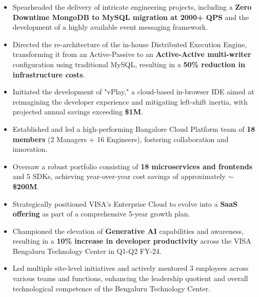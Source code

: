 \documentclass[10pt,a4paper,ragged2e,withhyper]{altacv}
\begin{document}
\begin{itemize}
  \item Spearheaded the delivery of intricate engineering projects, including a \textbf{Zero Downtime MongoDB to MySQL migration at 2000+ QPS} and the development of a highly available event messaging framework.
  \item Directed the re-architecture of the in-house Distributed Execution Engine, transforming it from an Active-Passive to an \textbf{Active-Active multi-writer} configuration using traditional MySQL, resulting in a \textbf{50\% reduction in infrastructure costs}.
  \item Initiated the development of "vPlay," a cloud-based in-browser IDE aimed at reimagining the developer experience and mitigating left-shift inertia, with projected annual savings exceeding \textbf{\$1M}.
  \item Established and led a high-performing Bangalore Cloud Platform team of \textbf{18 members} (2 Managers + 16 Engineers), fostering collaboration and innovation.
  \item Oversaw a robust portfolio consisting of \textbf{18 microservices and frontends} and 5 SDKs, achieving year-over-year cost savings of approximately \textbf{\(\sim\)\$200M}.
  \item Strategically positioned VISA's Enterprise Cloud to evolve into a \textbf{SaaS offering} as part of a comprehensive 5-year growth plan.
  \item Championed the elevation of \textbf{Generative AI} capabilities and awareness, resulting in a \textbf{10\% increase in developer productivity} across the VISA Bengaluru Technology Center in Q1-Q2 FY-24.
  \item Led multiple site-level initiatives and actively mentored 3 employees across various teams and functions, enhancing the leadership quotient and overall technological competence of the Bengaluru Technology Center.
\end{itemize}

\divider
\end{document}
